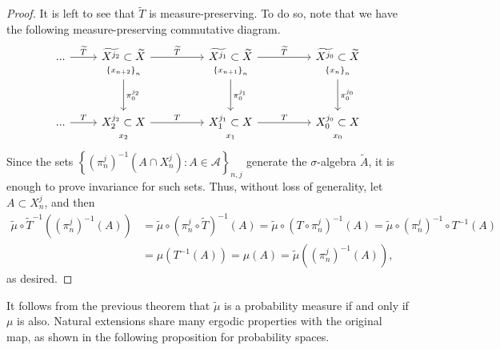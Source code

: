 \documentclass[11pt]{article}
\theoremstyle{definition}
\theoremstyle{remark}
\theoremstyle{plain}
\begin{document}
\begin{proof}
 	It is left to see that $ \widetilde{T} $ is measure-preserving. To do so, note that we have the following measure-preserving commutative diagram.
 	\[\begin{tikzcd}[row sep=-0.2em,/tikz/row 3/.style={row sep=4em}]
 		...\arrow{r}{\widetilde{T}} &	\widetilde{X^{j_2}}\subset \widetilde{X} \arrow{rr}{\widetilde{T}} & &		\widetilde{X^{j_1}}\subset \widetilde{X}\arrow{rr}{\widetilde{T}} &&\widetilde{X^{j_0}}\subset \widetilde{X} \\ 	 
 		&	{\scriptstyle \left\lbrace x_{n+2}\right\rbrace _n} \arrow{ddddddd}{\pi_{0}^{j_2}}& &	{\scriptstyle \left\lbrace x_{n+1}\right\rbrace _n }\arrow{ddddddd}{\pi_{0}^{j_1}} & &	{\scriptstyle \left\lbrace x_{n}\right\rbrace _n }\arrow{ddddddd}{\pi_{0}^{j_0}}\\ \\ \\	\\ \\ \\ \\...\arrow{r}{T} & X^{j_2}_{2}\subset X \arrow{rr}{T}   && X^{j_1}_1\subset X \arrow{rr}{T} &&X^{j_0}_0\subset X \\ &{\scriptstyle x_2}&&{\scriptstyle x_1} &&{\scriptstyle x_0}
 	\end{tikzcd}
 	\]
 Since the sets $ \left\lbrace (\pi_n^j)^{-1}(A\cap X^j_n)\colon A\in \mathcal{A}\right\rbrace _{n,j} $ generate the $ \sigma $-algebra $ \widetilde{A} $,  it is enough to prove invariance for such sets. Thus, without loss of generality, let $ A\subset  X^j_n$, and then \begin{align*}
 	\widetilde{\mu} \circ \widetilde{T}^{-1}( (\pi_n^j)^{-1}(A))&= \widetilde{\mu} \circ (\pi_n^j\circ \widetilde{T})^{-1}(A)= \widetilde{\mu} \circ (T\circ \pi_n^{j})^{-1}(A)= \widetilde{\mu} \circ(\pi_n^{j})^{-1}\circ T^{-1}(A)\\&=\mu (T^{-1}(A))= \mu (A)= \widetilde{ \mu} ( (\pi_n^j)^{-1}(A)),
 \end{align*}
 as desired.
 


\end{proof}
It follows from the previous theorem that $ \widetilde{\mu} $ is a probability measure if and only if  $ \mu $ is also. Natural extensions share many ergodic properties with the original map, as shown in the following proposition for probability spaces.  
\end{document}
